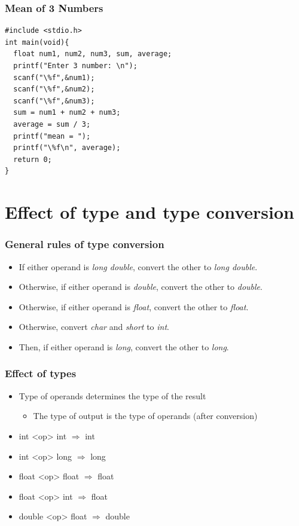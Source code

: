 \documentclass{../c-lecture}
\begin{document}
\begin{frame}[fragile]
  \frametitle{Mean of 3 Numbers}
  \begin{verbatim}
#include <stdio.h>
int main(void){
  float num1, num2, num3, sum, average;
  printf("Enter 3 number: \n");
  scanf("\%f",&num1);
  scanf("\%f",&num2);
  scanf("\%f",&num3);
  sum = num1 + num2 + num3;
  average = sum / 3;
  printf("mean = ");
  printf("\%f\n", average);
  return 0;
}
  \end{verbatim}
\end{frame}

\section{Effect of type and type conversion}

\begin{frame}
  \frametitle{General rules of type conversion}
  \begin{itemize}
    \item
      If either operand is \textit{\color{Orange} long double},
      convert the other to \textit{\color{Orange} long double}.

    \item
      Otherwise, if either operand is \textit{\color{LimeGreen} double},
      convert the other to \textit{\color{LimeGreen} double}.

    \item
      Otherwise, if either operand is \textit{\color{Cyan} float},
      convert the other to \textit{\color{Cyan} float}.

    \item
      Otherwise, convert \textit{\color{Orange} char} and
      \textit{\color{Orange} short} to
      \textit{\color{Orange} int}.

    \item
      Then, if either operand is \textit{\color{LimeGreen} long}, convert
      the other to \textit{\color{LimeGreen} long}.
  \end{itemize}
\end{frame}

\begin{frame}
  \frametitle{Effect of types}
  \begin{itemize}
    \item Type of operands determines the type of the result
    \begin{itemize}
      \item The type of output is the type of operands (after conversion)
    \end{itemize}
    \item int <op> int $\Rightarrow$ int
    \item int <op> long $\Rightarrow$ long
    \item float <op> float $\Rightarrow$ float
    \item float <op> int $\Rightarrow$ float
    \item double <op> float $\Rightarrow$ double
  \end{itemize}
\end{frame}
\end{document}
